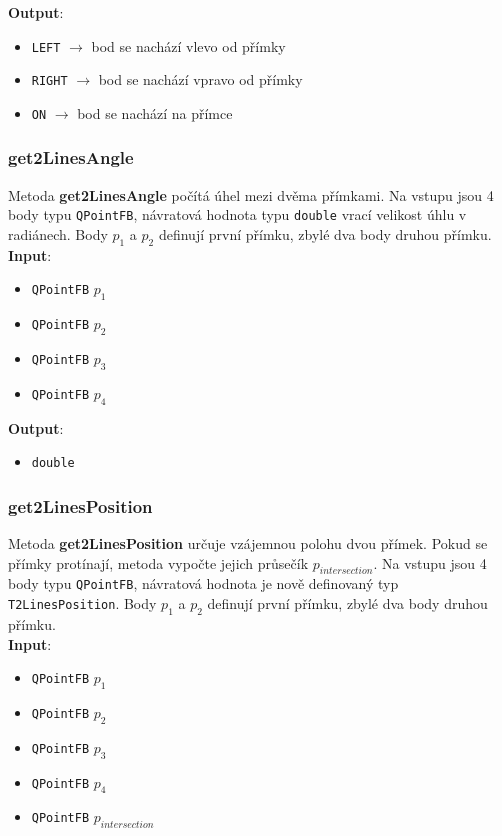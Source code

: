\documentclass[a4paper, 12pt]{article}
\begin{document}
\textbf{Output}:
\begin{itemize}
\item \texttt{LEFT} $\rightarrow$ bod se nachází vlevo od přímky
\item \texttt{RIGHT} $\rightarrow$ bod se nachází vpravo od přímky
\item \texttt{ON} $\rightarrow$ bod se nachází na přímce
\end{itemize}

\subsubsection*{get2LinesAngle}
Metoda \textbf{get2LinesAngle} počítá úhel mezi dvěma přímkami. Na vstupu jsou 4 body typu \texttt{QPointFB}, návratová hodnota typu \texttt{double} vrací velikost úhlu v radiánech. Body $p_1$ a $p_2$ definují první přímku, zbylé dva body druhou přímku.\\

\textbf{Input}:
\begin{itemize}
\item \texttt{QPointFB} $p_1$ 
\item \texttt{QPointFB} $p_2$ 
\item \texttt{QPointFB} $p_3$
\item \texttt{QPointFB} $p_4$
\end{itemize}

\textbf{Output}:
\begin{itemize}
\item \texttt{double} 
\end{itemize}

\subsubsection*{get2LinesPosition}
Metoda \textbf{get2LinesPosition} určuje vzájemnou polohu dvou přímek. Pokud se přímky protínají, metoda vypočte jejich průsečík $p_{intersection}$. Na vstupu jsou 4 body typu \texttt{QPointFB}, návratová hodnota je nově definovaný typ \texttt{T2LinesPosition}. Body $p_1$ a $p_2$ definují první přímku, zbylé dva body druhou přímku.\\

\textbf{Input}:
\begin{itemize}
\item \texttt{QPointFB} $p_1$ 
\item \texttt{QPointFB} $p_2$ 
\item \texttt{QPointFB} $p_3$
\item \texttt{QPointFB} $p_4$
\item \texttt{QPointFB} $p_{intersection}$
\end{itemize}
\end{document}
